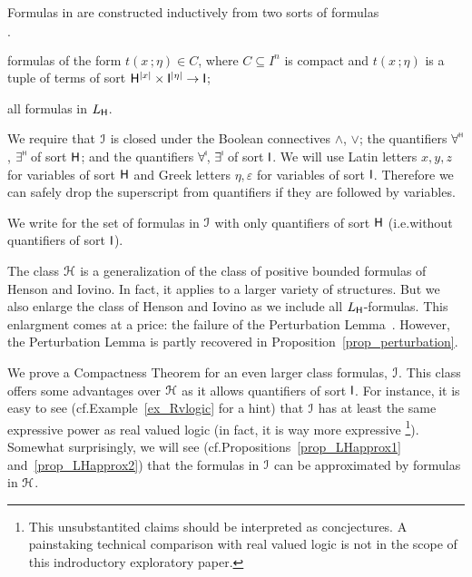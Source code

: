 \documentclass[10pt,oneside]{amsproc}
\newcommand{\mylabel}[1]{{#1}\hfill}
\renewenvironment{itemize}
  {\begin{list}{$\cdot$}{%
  \setlength{\parskip}{0mm}
  \setlength{\topsep}{.4\baselineskip}
  \setlength{\rightmargin}{0mm}
  \setlength{\listparindent}{0mm}
  \setlength{\itemindent}{0mm}
  \setlength{\labelwidth}{3ex}
  \setlength{\itemsep}{.2\baselineskip}
  \setlength{\parsep}{.2\baselineskip}
  \setlength{\partopsep}{0mm}
  \setlength{\labelsep}{1ex}
  \setlength{\leftmargin}{\labelwidth+\labelsep}
  \let\makelabel\mylabel}}{%
\end{list}}
\renewcommand*{\emph}[1]{%
   \smash{\tikz[baseline]\node[rectangle, fill=teal!25, rounded corners, inner xsep=0.5ex, inner ysep=0.2ex, anchor=base, minimum height = 2.7ex]{\strut #1};}}
\begin{document}
\begin{definition}\label{def_LL}
  Formulas in \emph{${\EuScript I}$\/} are constructed inductively from two sorts of \emph{${\EuScript I}$-atomic\/} formulas
  \begin{itemize}
  \item[i.] formulas of the form $t(x\,;\eta)\in C$, where $C\subseteq I^n$ is compact and $t(x\,;\eta)$ is a tuple of terms of sort ${\sf H}^{|x|}\times {\sf I}^{|\eta|}\to {\sf I}$; 
  \item[ii.] all formulas in $L_{\sf H}$.
  \end{itemize}
  We require that ${\EuScript I}$ is closed under the Boolean connectives $\wedge$, $\vee$; the quantifiers $\forall\raisebox{1.1ex}{\scaleto{\sf H}{.8ex}\kern-.2ex}$, $\exists\raisebox{1.1ex}{\scaleto{\sf H}{.8ex}\kern-.2ex}$ of sort ${\sf H}$; and the quantifiers $\forall\raisebox{1.1ex}{\scaleto{\sf I}{.8ex}\kern-.2ex}$, $\exists\raisebox{1.1ex}{\scaleto{\sf I}{.8ex}\kern-.2ex}$ of sort ${\sf I}$.
  We will use Latin letters $x,y,z$ for variables of sort ${\sf H}$ and Greek letters $\eta,\varepsilon$ for variables of sort ${\sf I}$.
  Therefore we can safely drop the superscript from quantifiers if they are followed by variables.

  We write \emph{${\EuScript H}$ \/} for the set of formulas in ${\EuScript I}$ with only quantifiers of sort ${\sf H}$ (i.e.\@ without quantifiers of sort ${\sf I}$).
\end{definition}

The class ${\EuScript H}$ is a generalization of the class of positive bounded formulas of Henson and Iovino.
In fact, it applies to a larger variety of structures.
But we also enlarge the class of Henson and Iovino as we 
include all $L_{\sf H}$-formulas. 
This enlargment comes at a price: the failure of the Perturbation Lemma~\cite[Proposition~5.15]{HI}.
However, the Perturbation Lemma is partly recovered in Proposition~\ref{prop_perturbation}.

We prove a Compactness Theorem for an even larger class formulas, ${\EuScript I}$.
This class offers some advantages over ${\EuScript H}$ as it allows quantifiers of sort ${\sf I}$.
For instance, it is easy to see (cf.\@ Example~\ref{ex_Rvlogic} for a hint) that ${\EuScript I}$ has at least the same expressive power as real valued logic (in fact, it is way more expressive%
\footnote{This unsubstantited claims should be interpreted as concjectures.
A painstaking technical comparison with real valued logic is not in the scope of this indroductory exploratory paper.}).
Somewhat surprisingly, we will see (cf.\@ Propositions~\ref{prop_LHapprox1} and~\ref{prop_LHapprox2}) that the formulas in ${\EuScript I}$ can be approximated by formulas in ${\EuScript H}$.
\end{document}
